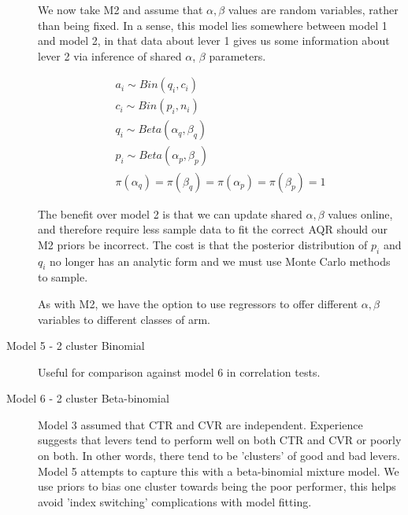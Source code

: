 \documentclass[11pt,a4,singlespacing,titlepagenumber=on]{scrreprt}
\numberwithin{equation}{chapter} %
\theoremstyle{remark}
\begin{document}
\begin{description}

We now take M2 and assume that $\alpha, \beta$ values are random variables, rather than being fixed. In a sense, this model lies somewhere between model 1 and model 2, in that data about lever 1 gives us some information about lever 2 via inference of shared $\alpha$, $\beta$ parameters. 

  \begin{align}
	a_i \sim Bin(q_i,c_i) \\
	c_i \sim Bin(p_i,n_i) \\
	q_i \sim Beta(\alpha_q,\beta_q) \\
	p_i \sim Beta(\alpha_p,\beta_p) \\
	\pi(\alpha_q) = \pi(\beta_q) = \pi(\alpha_p) = \pi(\beta_p) = 1
  \end{align}

The benefit over model 2 is that we can update shared $\alpha, \beta$ values online, and therefore require less sample data to fit the correct AQR should our M2 priors be incorrect. The cost is that the posterior distribution of $p_i$ and $q_i$ no longer has an analytic form and we must use Monte Carlo methods to sample.

As with M2, we have the option to use regressors to offer different $\alpha, \beta$ variables to different classes of arm.


	\item[Model 5 - 2 cluster Binomial]

Useful for comparison against model 6 in correlation tests.

	\item[Model 6 - 2 cluster Beta-binomial]

Model 3 assumed that CTR and CVR are independent. Experience suggests that levers tend to perform well on both CTR and CVR or poorly on both. In other words, there tend to be 'clusters' of good and bad levers. Model 5 attempts to capture this with a beta-binomial mixture model. We use priors to bias one cluster towards being the poor performer, this helps avoid 'index switching' complications with model fitting. 
 

\end{description}
\end{document}
